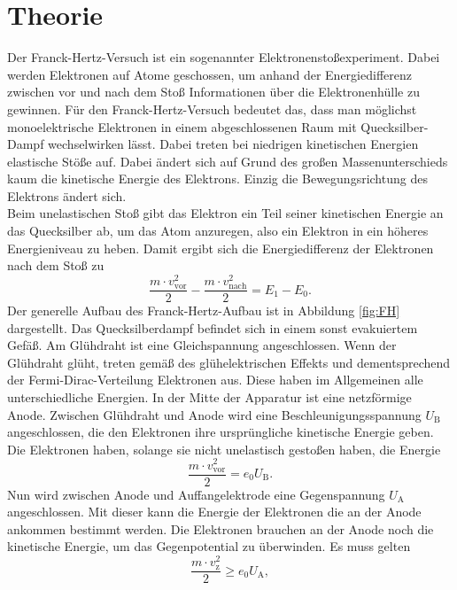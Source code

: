 \section{Theorie}
\label{sec:Theorie}
Der Franck-Hertz-Versuch ist ein sogenannter Elektronenstoßexperiment. Dabei werden Elektronen 
auf Atome geschossen, um anhand der Energiedifferenz zwischen vor und nach dem Stoß Informationen 
über die Elektronenhülle zu gewinnen. Für den Franck-Hertz-Versuch bedeutet das, dass man 
möglichst monoelektrische Elektronen in einem abgeschlossenen Raum mit Quecksilber-Dampf wechselwirken lässt.
Dabei treten bei niedrigen kinetischen Energien elastische Stöße auf. Dabei ändert sich auf Grund des großen Massenunterschieds 
kaum die kinetische Energie des Elektrons. Einzig die Bewegungsrichtung des Elektrons
ändert sich.\\
Beim unelastischen Stoß gibt das Elektron ein Teil seiner kinetischen Energie an das Quecksilber ab, 
um das Atom anzuregen, also ein Elektron in ein höheres Energieniveau zu heben.
Damit ergibt sich die Energiedifferenz der Elektronen nach dem Stoß zu
\begin{equation} 
    \frac{m\cdot v_\text{vor}^2}{2}-\frac{m\cdot v_\text{nach}^2}{2}=E_1-E_0.
    \label{eq:diff}
\end{equation}
Der generelle Aufbau des Franck-Hertz-Aufbau ist in Abbildung \ref{fig:FH} dargestellt.
Das Quecksilberdampf befindet sich in einem sonst evakuiertem Gefäß. Am Glühdraht ist eine Gleichspannung 
angeschlossen. Wenn der Glühdraht glüht, treten gemäß des glühelektrischen Effekts und dementsprechend
der Fermi-Dirac-Verteilung Elektronen aus. Diese haben im Allgemeinen alle unterschiedliche Energien.
In der Mitte der Apparatur ist eine netzförmige Anode. Zwischen Glühdraht und Anode wird 
eine Beschleunigungsspannung $U_\text{B}$ angeschlossen, die den Elektronen ihre ursprüngliche kinetische Energie geben.
Die Elektronen haben, solange sie nicht unelastisch gestoßen haben, die Energie
\begin{equation} 
    \frac{m\cdot v_\text{vor}^2}{2}=e_0U_\text{B}.
    \label{eq:ekin}
\end{equation}
Nun wird zwischen Anode und Auffangelektrode eine Gegenspannung $U_\text{A}$ angeschlossen. Mit dieser kann
die Energie der Elektronen die an der Anode ankommen bestimmt werden. Die Elektronen brauchen an der Anode noch die kinetische 
Energie, um das Gegenpotential zu überwinden. Es muss gelten 
\begin{equation}
    \label{eq:minE}
    \frac{m\cdot v_\text{z}^2}{2} \geq e_0U_\text{A},
\end{equation}
